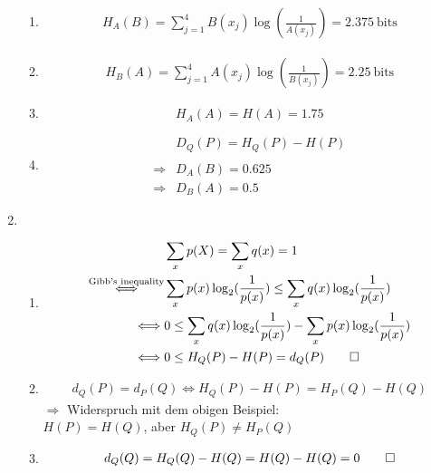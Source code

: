 \documentclass{article}
\begin{document}
\begin{enumerate}
        \begin{enumerate}[label=\alph*)]
          \item
                \begin{align*}
                  H_A(B) =\sum_{j=1}^4B(x_j) \log\left(\frac{1}{A(x_j)}\right)=2.375 \ \text{bits}
                \end{align*}
          \item
                \begin{align*}
                  H_B(A) =\sum_{j=1}^4A(x_j) \log\left(\frac{1}{B(x_j)}\right)=2.25 \ \text{bits}
                \end{align*}
          \item \begin{equation*}
                  H_A(A)=H(A)=1.75
                \end{equation*}
          \item
                \begin{align*}
                              & D_Q(P) = H_Q(P) -H(P) \\\\
                  \Rightarrow & D_A(B) = 0.625        \\
                  \Rightarrow & D_B(A) = 0.5
                \end{align*}
        \end{enumerate}
  \item
        \begin{enumerate}[label=\\ zu \Roman*):]
          \item
                \begin{align*}
                                                           & \sum_x p(X) = \sum_x q(x) = 1                                                  \\
                  \overset{\text{Gibb's inequality}}{\iff} & \sum_x p(x) \log_2(\frac{1}{p(x)}) \leq  \sum_x q(x) \log_2(\frac{1}{p(x)})    \\
                  \iff                                     & 0 \leq \sum_x q(x) \log_2(\frac{1}{p(x)}) - \sum_x p(x) \log_2(\frac{1}{p(x)}) \\
                  \iff                                     & 0 \leq H_Q(P)-H(P) = d_Q(P) \qed
                \end{align*}
          \item
                \begin{align*}
                  d_Q(P) = d_P(Q) \iff H_Q(P)-H(P) = H_P(Q) - H(Q)
                \end{align*}
                $\Rightarrow$ Widerspruch mit dem obigen Beispiel:\\
                $H(P) = H(Q)$, aber $H_Q(P) \neq H_P(Q)$
          \item
                \begin{align*}
                  d_Q(Q) = H_Q(Q) - H(Q) = H(Q) -H(Q) = 0 \qed
                \end{align*}
        \end{enumerate}


\end{enumerate}
\end{document}
